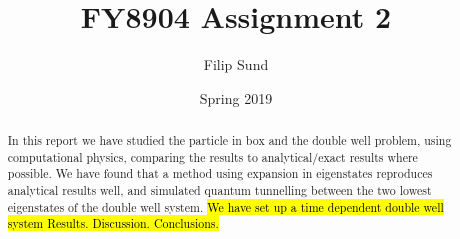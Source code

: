 \documentclass[a4paper,twocolumn]{article}
\title{FY8904 Assignment 2}
\date{Spring 2019}
\author{Filip Sund}
\newcommand{\cpp}{\texttt{C++}}
\newcommand{\cppeleven}{\texttt{C++11}}
\begin{document}
\maketitle

\begin{abstract}
    In this report we have studied the particle in box and the double well problem, using computational physics, comparing the results to analytical/exact results where possible. We have found that a method using expansion in eigenstates reproduces analytical results well, and simulated quantum tunnelling between the two lowest eigenstates of the double well system. \hl{We have set up a time dependent double well system  Results. Discussion. Conclusions.}
\end{abstract}

\end{document}
